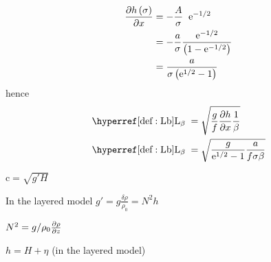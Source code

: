 \begin{fullwidth}
\begin{multicols}{2}
\begin{definition}
\begin{align*}
	\frac{\partial h\left(\sigma\right)}{\partial x}
	&=
-    \frac{ A}{\sigma} \;\; \mathrm{e}^{-1/2} \\
	&=
- \frac{a}{\sigma}   \frac{ \mathrm{e}^{-1/2}}{ \left( 1 - \mathrm{e}^{-1/2} \right)} \\
	&=
   \frac{a}{\sigma \left( \mathrm{e}^{1/2}  - 1   \right)}
\end{align*}
hence
\begin{align}
\Lb &= \sqrt{ \frac{g}{f} \dpr{h}{x} \frac{1}{ \beta}} \nonumber \\
\Lb &= \sqrt{ \frac{g}{\eexp{1/2}-1} \frac{a}{f \sigma \beta}  }
\end{align}
\end{definition}
\begin{definition}\label{def:c}
$\mathrm{c}  = \sqrt{g'H} $
 \end{definition}
\begin{definition}\label{def:gr}
In the layered model $g'=g \frac{\delta \rho}{\rho_0} = N^{2}h$
 \end{definition}
\begin{definition}\label{def:eta}
 \end{definition}
\begin{definition}\label{def:BVf}
$N^2=g/\rho_0 \frac{\partial\rho}{\partial z}$
 \end{definition}
\begin{definition}\label{def:H}
 \end{definition}
\begin{definition}\label{def:h}
$h = H+\eta$ (in the layered model)
 \end{definition}

\end{multicols}
\end{fullwidth}
